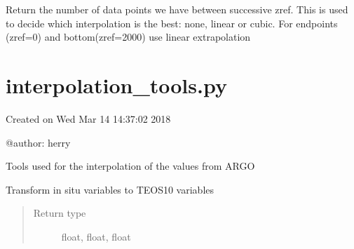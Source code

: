 \documentclass[letterpaper,10pt,english]{sphinxmanual}
\begin{document}

\begin{fulllineitems}
\label{\detokenize{pargopy:pargopy.general_tools.select_depth}}
Return the number of data points we have between successive zref.
This is used to decide which interpolation is the best: none,
linear or cubic. For endpoints (zref=0) and bottom(zref=2000) use
linear extrapolation

\end{fulllineitems}



\section{interpolation\_tools.py}
\label{\detokenize{pargopy:interpolation-tools-py}}\label{\detokenize{pargopy:module-pargopy.interpolation_tools}}
Created on Wed Mar 14 14:37:02 2018

@author: herry

Tools used for the interpolation of the values from ARGO

\begin{fulllineitems}
\label{\detokenize{pargopy:pargopy.interpolation_tools.insitu_to_absolute}}
Transform in situ variables to TEOS10 variables
\begin{quote}\begin{description}
\item[{Return type}] \leavevmode
float, float, float

\end{description}\end{quote}

\end{fulllineitems}

\end{document}
